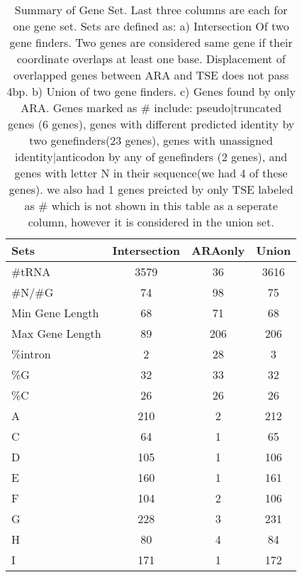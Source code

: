 \documentclass[table,
12pt, %
a4paper, %
oneside, %
headinclude,footinclude, %
BCOR5mm, %
]{scrartcl}
\begin{document}
\begin{table}[htbp]
  \caption{Summary of Gene Set. Last three columns are each for one gene set. Sets are defined as: a) Intersection Of two gene finders. Two genes are considered same gene if their coordinate overlaps at least one base. Displacement of overlapped genes between ARA and TSE does not pass 4bp. b) Union of two gene finders. c) Genes found by only ARA. Genes marked as \# include: pseudo|truncated genes (6 genes), genes with different predicted identity by two genefinders(23 genes), genes with unassigned identity|anticodon by any of genefinders (2 genes), and genes with letter N in their sequence(we had 4 of these genes). we also had 1 genes preicted by only TSE labeled as \# which is not shown in this table as a seperate column, however it is considered in the union set.}
  \begin{adjustbox}{center}
    \begin{tabular}{|lccc|}
      \hline
      \rowcolor{shadecolor}
      Sets            & Intersection & ARAonly & Union \\
      \hline\hline
      \#tRNA          & 3579         & 36      & 3616  \\
      \#N/\#G         & 74           & 98      & 75    \\
      Min Gene Length & 68           & 71      & 68    \\
      Max Gene Length & 89           & 206     & 206   \\
      \%intron        & 2            & 28      & 3     \\
      \%G             & 32           & 33      & 32    \\
      \%C             & 26           & 26      & 26    \\
      A               & 210          & 2       & 212   \\
      C               & 64           & 1       & 65    \\
      D               & 105          & 1       & 106   \\
      E               & 160          & 1       & 161   \\
      F               & 104          & 2       & 106   \\
      G               & 228          & 3       & 231   \\
      H               & 80           & 4       & 84    \\
      I               & 171          & 1       & 172   \\

\end{tabular}
\end{adjustbox}
\end{table}
\end{document}
